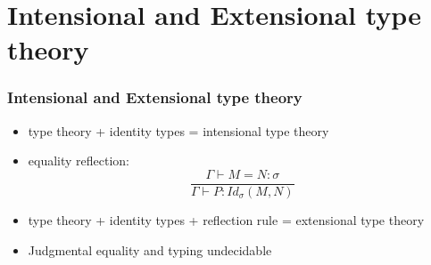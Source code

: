\documentclass[aspectratio=169]{beamer}
\newcommand{\Id}[2]{Id_\sigma(#1,#2)}
\begin{document}
    \section{Intensional and Extensional type theory}
    \begin{frame}
        \frametitle{Intensional and Extensional type theory}
        \begin{itemize}
            \item type theory + identity types = intensional type theory
            \item equality reflection:
            $$\frac{\Gamma \vdash M = N : \sigma}{\Gamma \vdash P: \Id{M}{N}}$$
            \item type theory + identity types + reflection rule = extensional type theory
            \item Judgmental equality and typing undecidable
        \end{itemize}
    \end{frame}
\end{document}
